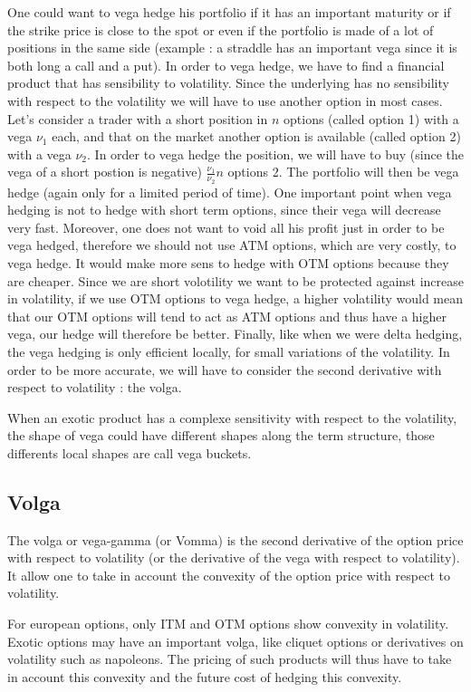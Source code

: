 \documentclass[hidelinks]{article}
\begin{document}
    One could want to vega hedge his portfolio if it has an important maturity or if the strike price is close to the spot or even if the portfolio is made of a lot of positions in the same side (example : a straddle has an important vega since it is both long a call and a put). In order to vega hedge, we have to find a financial product that has sensibility to volatility. Since the underlying has no sensibility with respect to the volatility we will have to use another option in most cases. Let's consider a trader with a short position in $n$ options (called option 1) with a vega $\nu_1$ each, and that on the market another option is available (called option 2) with a vega $\nu_2$. In order to vega hedge the position, we will have to buy (since the vega of a short postion is negative) $\frac{\nu_1}{\nu_2}n$ options 2. The portfolio will then be vega hedge (again only for a limited period of time). One important point when vega hedging is not to hedge with short term options, since their vega will decrease very fast. Moreover, one does not want to void all his profit just in order to be vega hedged, therefore we should not use ATM options, which are very costly, to vega hedge. It would make more sens to hedge with OTM options because they are cheaper. Since we are short volotility we want to be protected against increase in volatility, if we use OTM options to vega hedge, a higher volatility would mean that our OTM options will tend to act as ATM options and thus have a higher vega, our hedge will therefore be better.  Finally, like when we were delta hedging, the vega hedging is only efficient locally, for small variations of the volatility. In order to be more accurate, we will have to consider the second derivative with respect to volatility : the volga.
    
    When an exotic product has a complexe sensitivity with respect to the volatility, the shape of vega could have different shapes along the term structure, those differents local shapes are call vega buckets.
    
    \subsection{Volga}
    The volga or vega-gamma (or Vomma) is the second derivative of the option price with respect to volatility (or the derivative of the vega with respect to volatility). It allow one to take in account the convexity of the option price with respect to volatility.
    
    For european options, only ITM and OTM options show convexity in volatility. Exotic options may have an important volga, like cliquet options or derivatives on volatility such as napoleons. The pricing of such products will thus have to take in account this convexity and the future cost of hedging this convexity.
    
\end{document}
